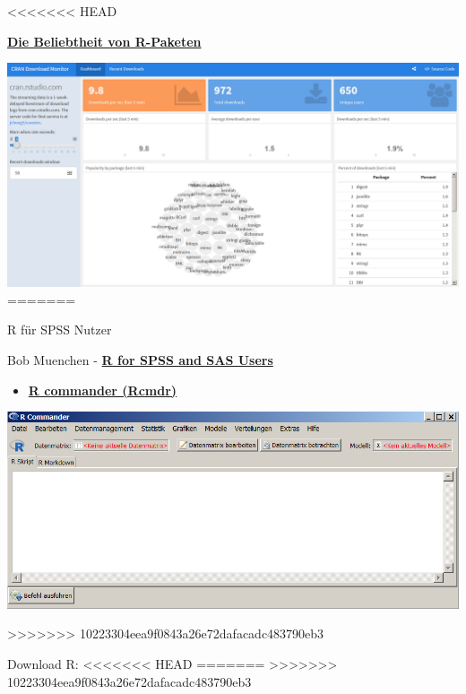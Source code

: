 \documentclass[ignorenonframetext,]{beamer}
\providecommand{\tightlist}{%
  \setlength{\itemsep}{0pt}\setlength{\parskip}{0pt}}
\begin{document}
<<<<<<< HEAD
\begin{frame}{\href{https://gallery.shinyapps.io/cran-gauge/}{\textbf{Die
Beliebtheit von R-Paketen}}}

\includegraphics{figure/CRANdownloads.PNG}
=======
\begin{frame}{R für SPSS Nutzer}
\protect\hypertarget{r-fur-spss-nutzer}{}

\begin{block}{Bob Muenchen -
\href{https://science.nature.nps.gov/im/datamgmt/statistics/r/documents/r_for_sas_spss_users.pdf}{\textbf{R
for SPSS and SAS Users }}}

\begin{itemize}
\tightlist
\item
  \href{http://www.rcommander.com/}{\textbf{R commander (Rcmdr)}}
\end{itemize}

\includegraphics{figure/Rcommanderex.PNG}

\end{block}
>>>>>>> 10223304eea9f0843a26e72dafacadc483790eb3

\end{frame}

\begin{frame}{Download R:}
<<<<<<< HEAD
=======
\protect\hypertarget{download-r}{}
>>>>>>> 10223304eea9f0843a26e72dafacadc483790eb3


\end{frame}
\end{frame}
\end{document}
